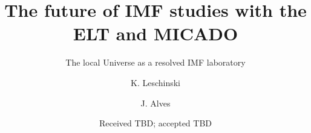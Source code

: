 \documentclass{aa}
\begin{document}
 

  \title{The future of IMF studies with the ELT and MICADO}
  \subtitle{The local Universe as a resolved IMF laboratory}
  \author{K. Leschinski
     \and
          J. Alves
     }


  \date{Received TBD; accepted TBD}

      

  \keywords{}

\maketitle





%






\appendix


\end{document}
